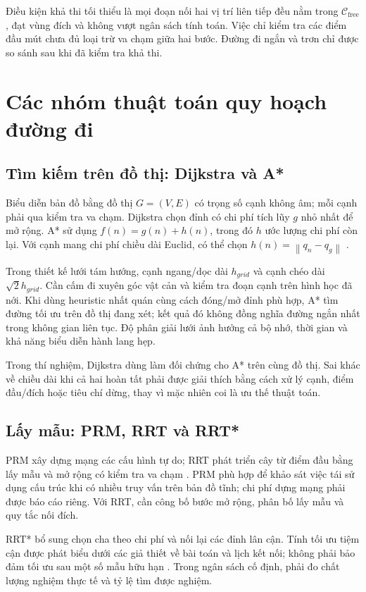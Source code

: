 \documentclass[12pt,a4paper,oneside]{report}
\numberwithin{equation}{chapter}
\newcommand{\norm}[1]{\left\lVert #1\right\rVert}
\begin{document}
Điều kiện khả thi tối thiểu là mọi đoạn nối hai vị trí liên tiếp đều nằm trong $\mathcal C_{\mathrm{free}}$, đạt vùng đích và không vượt ngân sách tính toán. Việc chỉ kiểm tra các điểm đầu mút chưa đủ loại trừ va chạm giữa hai bước. Đường đi ngắn và trơn chỉ được so sánh sau khi đã kiểm tra khả thi.

\section{Các nhóm thuật toán quy hoạch đường đi}

\subsection{Tìm kiếm trên đồ thị: Dijkstra và A*}

Biểu diễn bản đồ bằng đồ thị $G=(V,E)$ có trọng số cạnh không âm; mỗi cạnh phải qua kiểm tra va chạm. Dijkstra chọn đỉnh có chi phí tích lũy $g$ nhỏ nhất để mở rộng. A* sử dụng $f(n)=g(n)+h(n)$, trong đó $h$ ước lượng chi phí còn lại. Với cạnh mang chi phí chiều dài Euclid, có thể chọn $h(n)=\norm{q_n-q_g}$ \cite{lavalle}.

Trong thiết kế lưới tám hướng, cạnh ngang/dọc dài $h_{grid}$ và cạnh chéo dài $\sqrt2h_{grid}$. Cần cấm đi xuyên góc vật cản và kiểm tra đoạn cạnh trên hình học đã nới. Khi dùng heuristic nhất quán cùng cách đóng/mở đỉnh phù hợp, A* tìm đường tối ưu trên đồ thị đang xét; kết quả đó không đồng nghĩa đường ngắn nhất trong không gian liên tục. Độ phân giải lưới ảnh hưởng cả bộ nhớ, thời gian và khả năng biểu diễn hành lang hẹp.

Trong thí nghiệm, Dijkstra dùng làm đối chứng cho A* trên cùng đồ thị. Sai khác về chiều dài khi cả hai hoàn tất phải được giải thích bằng cách xử lý cạnh, điểm đầu/đích hoặc tiêu chí dừng, thay vì mặc nhiên coi là ưu thế thuật toán.

\subsection{Lấy mẫu: PRM, RRT và RRT*}

PRM xây dựng mạng các cấu hình tự do; RRT phát triển cây từ điểm đầu bằng lấy mẫu và mở rộng có kiểm tra va chạm \cite{lavalle}. PRM phù hợp để khảo sát việc tái sử dụng cấu trúc khi có nhiều truy vấn trên bản đồ tĩnh; chi phí dựng mạng phải được báo cáo riêng. Với RRT, cần công bố bước mở rộng, phân bố lấy mẫu và quy tắc nối đích.

RRT* bổ sung chọn cha theo chi phí và nối lại các đỉnh lân cận. Tính tối ưu tiệm cận được phát biểu dưới các giả thiết về bài toán và lịch kết nối; không phải bảo đảm tối ưu sau một số mẫu hữu hạn \cite{karaman}. Trong ngân sách cố định, phải đo chất lượng nghiệm thực tế và tỷ lệ tìm được nghiệm.
\end{document}
